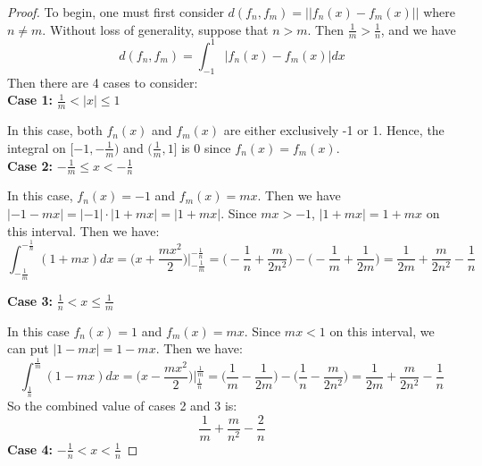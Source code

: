 \documentclass[12pt, letterpaper]{article}
\begin{document}
\begin{proof}
  To begin, one must first consider $d(f_n, f_m) = ||f_n(x) - f_m(x)||$ where $n \neq m$. Without loss of generality, suppose that $n > m$. Then $\frac{1}{m} > \frac{1}{n}$, and we have
  $$ d(f_n, f_m) = \int_{-1}^{1} |f_n(x) - f_m(x)|dx$$
  Then there are 4 cases to consider:\\
  \noindent\textbf{Case 1:} $ \frac{1}{m} < |x| \leq 1$

  \noindent In this case, both $f_n(x)$ and $f_m(x)$ are either exclusively -1 or 1. Hence, the integral on $[-1, -\frac{1}{m})$ and $(\frac{1}{m}, 1]$ is 0 since $f_n(x) = f_m(x)$.\\

  \noindent\textbf{Case 2:} $-\frac{1}{m} \leq x < -\frac{1}{n}$

  \noindent In this case, $f_n(x) = -1$ and $f_m(x) = mx$. Then we have $|-1 - mx| = |-1|\cdot|1 + mx| = |1 + mx|$. Since $mx > -1$, $|1 + mx| = 1 + mx$ on this interval. Then we have:
  $$ \int_{-\frac{1}{m}}^{-\frac{1}{n}} (1 + mx)dx = \bigg(x + \frac{mx^2}{2}\bigg)\bigg\rvert_{-\frac{1}{m}}^{-\frac{1}{n}} = \bigg(-\frac{1}{n} + \frac{m}{2n^2}\bigg) - \bigg(-\frac{1}{m} + \frac{1}{2m} \bigg) = \frac{1}{2m} + \frac{m}{2n^2} - \frac{1}{n}$$

  \noindent\textbf{Case 3:} $\frac{1}{n} < x \leq \frac{1}{m}$

  \noindent In this case $f_n(x) = 1$ and $f_m(x) = mx$. Since $mx < 1$ on this interval, we can put $|1 - mx| = 1 - mx$. Then we have:
  $$ \int_{\frac{1}{n}}^{\frac{1}{m}} (1 - mx)dx = \bigg(x - \frac{mx^2}{2}\bigg)\bigg\rvert_{\frac{1}{n}}^{\frac{1}{m}} = \bigg( \frac{1}{m} - \frac{1}{2m}\bigg) - \bigg(\frac{1}{n} - \frac{m}{2n^2}\bigg) = \frac{1}{2m} + \frac{m}{2n^2} - \frac{1}{n}$$
  So the combined value of cases 2 and 3 is:
  $$\frac{1}{m} + \frac{m}{n^2} - \frac{2}{n}$$
  \textbf{Case 4:} $-\frac{1}{n} < x < \frac{1}{n}$


\end{proof}
\end{document}
